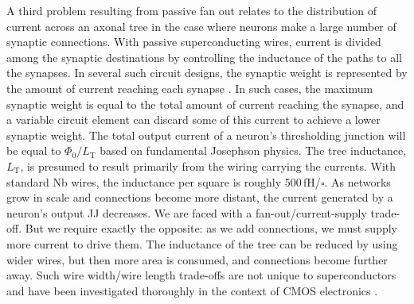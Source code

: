 A third problem resulting from passive fan out relates to the distribution of current across an axonal tree in the case where neurons make a large number of synaptic connections. With passive superconducting wires, current is divided among the synaptic destinations by controlling the inductance of the paths to all the synapses. In several such circuit designs, the synaptic weight is represented by the amount of current reaching each synapse \cite{scdo2018,xxx,yyy}. In such cases, the maximum synaptic weight is equal to the total amount of current reaching the synapse, and a variable circuit element can discard some of this current to achieve a lower synaptic weight. The total output current of a neuron's thresholding junction will be equal to $\Phi_0/L_{\mathrm{T}}$ based on fundamental Josephson physics. The tree inductance, $L_{\mathrm{T}}$, is presumed to result primarily from the wiring carrying the currents. With standard Nb wires, the inductance per square is roughly 500\,fH/$\square$. As networks grow in scale and connections become more distant, the current generated by a neuron's output JJ decreases. We are faced with a fan-out/current-supply trade-off. But we require exactly the opposite: as we add connections, we must supply more current to drive them. The inductance of the tree can be reduced by using wider wires, but then more area is consumed, and connections become further away. Such wire width/wire length trade-offs are not unique to superconductors and have been investigated thoroughly in the context of CMOS electronics \cite{}.

